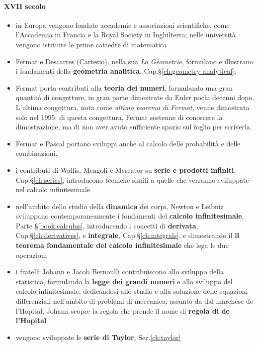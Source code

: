 \paragraph{XVII secolo}
\begin{itemize}
  \item in Europa vengono fondate accademie e associazioni scientifiche, come l'Accademia in Francia e la Royal Society in Inghilterra; nelle università vengono istituite le prime cattedre di matematica
  \item Fermat e Descartes (Cartesio), nella sua \textit{La Gèometrie}, formulano e illustrano i fondamenti della \textbf{geometria analitica}, Cap.\S\ref{ch:geometry-analytical};
  \item Fermat porta contributi alla \textbf{teoria dei numeri}, formulando una gran quantità di congetture, in gran parte dimostrate da Euler pochi decenni dopo. L'ultima congettura, nota come \textit{ultimo teorema di Fermat}, venne dimostrata solo nel 1995: di questa congettura, Fermat sostenne di conoscere la dimostrazione, ma di non aver avuto sufficiente spazio sul foglio per scriverla.
  \item Fermat e Pascal portano sviluppi anche al calcolo delle probabilità e delle combinazioni.
  \item i contributi di Wallis, Mengoli e Mercator su \textbf{serie e prodotti infiniti}, Cap.\S\ref{ch:series}, introducono tecniche simili a quelle che verranno sviluppate nel calcolo infinitesimale 
  \item nell'ambito dello studio della \textbf{dinamica} dei corpi, Newton e Leibniz sviluppano contemporaneamente i fondamenti del \textbf{calcolo infinitesimale}, Parte \S\ref{book:calculus}, introducendo i concetti di \textbf{derivata}, Cap.\S\ref{ch:derivatives}, e \textbf{integrale}, Cap.\S\ref{ch:integrals}, e dimostrando il \textbf{il teorema fondamentale del calcolo infinitesimale} che lega le due operazioni 
  \item i fratelli Johann e Jacob Bernoulli contribuiscono allo sviluppo della statistica, formulando la \textbf{legge dei grandi numeri} e allo sviluppo del calcolo infinitesimale, dedicandosi allo studio e alla soluzione delle equazioni differenziali nell'ambito di problemi di meccanica; assunto da dal marchese de l'Hopital, Johann scopre la regola che prende il nome di \textbf{regola di de l'Hopital}
  \item vengono sviluppate le \textbf{serie di Taylor}, Sez.\ref{ch:taylor}
\end{itemize}
